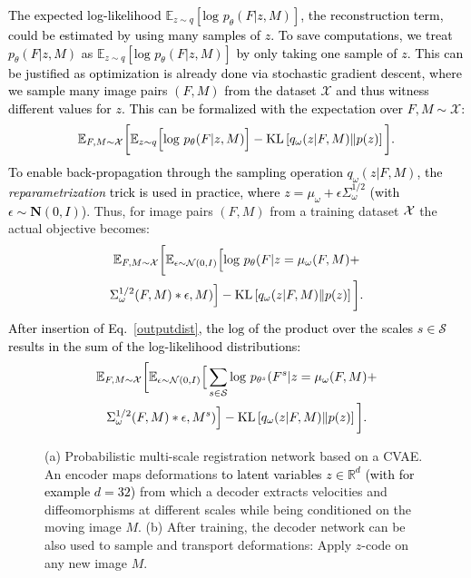 \documentclass[journal]{IEEEtran}
\newcommand{\update}[1]{\textcolor{black}{#1}}
\begin{document}
\update{The expected log-likelihood $\mathbb{E}_{z\sim q}\left[\text{log } p_\theta(F|z,M) \right]$, the reconstruction term, could be estimated by using many samples of $z$. To save computations, we treat $p_\theta(F|z,M)$ as $\mathbb{E}_{z\sim q}\left[\text{log } p_\theta(F|z,M) \right]$ by only taking one sample of $z$. This can be justified as optimization is already done via stochastic gradient descent, where we sample many image pairs $(F,M)$ from the dataset $\mathcal{X}$ and thus witness different values for $z$. This can be formalized with the expectation over $F,M\sim \mathcal{X}$:}
\begin{equation*}
\update{
\mathbb{E}_{F,M\sim \cal{X}} \bigg[ \mathbb{E}_{z \sim q} \Big[\text{log } p_{\theta}(F|z,M) \Big] - \text{KL}\left[q_\omega(z|F,M)\| p(z) \right] \bigg].}
\end{equation*}
\update{To enable back-propagation through the sampling operation $q_\omega(z|F,M)$, the \emph{reparametrization} trick \cite{kingma2013auto} is used in practice, where $z=\mu_\omega + \epsilon \Sigma_\omega^{1/2}$ (with $\epsilon \sim \mathbf{N}(0,I)$)}. Thus, for image pairs $(F,M)$ from a training dataset $\cal{X}$ the actual objective becomes:
\update{\begin{multline}
\mathbb{E}_{F,M\sim \cal{X}} \bigg[ \mathbb{E}_{\epsilon \sim \mathcal{N}(0,I)} \Big[\text{log } p_{\theta}(F|z=\mu_\omega(F,M) + \\ \Sigma_\omega^{1/2}(F,M) \ast \epsilon,M) \Big] - 
\text{KL}\left[q_\omega(z|F,M)\| p(z) \right] \bigg].
\end{multline}}
\update{After insertion of Eq.~\ref{outputdist}, the $\text{log}$ of the product over the scales $s\in \mathcal{S}$ results in the sum of the log-likelihood distributions:}
\begin{multline}\label{repara_trick}
\mathbb{E}_{F,M\sim \cal{X}} \bigg[ \mathbb{E}_{\epsilon \sim \mathcal{N}(0,I)} \Big[\sum_{s\in \mathcal{S}} \text{log } p_{\theta^s}(F^s|z=\mu_\omega(F,M) + \\ \Sigma_\omega^{1/2}(F,M) \ast \epsilon,M^s) \Big] - 
\text{KL}\left[q_\omega(z|F,M)\| p(z) \right] \bigg].
\end{multline}

\begin{figure*}[tb]
\centering 
{}\hfill
{}
\caption{\small{(a) Probabilistic multi-scale registration network based on a CVAE. An encoder maps deformations \update{to latent variables $z\in\mathbb{R}^d$ (with for example $d=32$)} from which a decoder extracts velocities and diffeomorphisms at different scales while being conditioned on the moving image $M$. (b) After training, the decoder network can be also used to sample and transport deformations: Apply $z$-code on any new image $M$. 
}}
\end{figure*}
\end{document}
